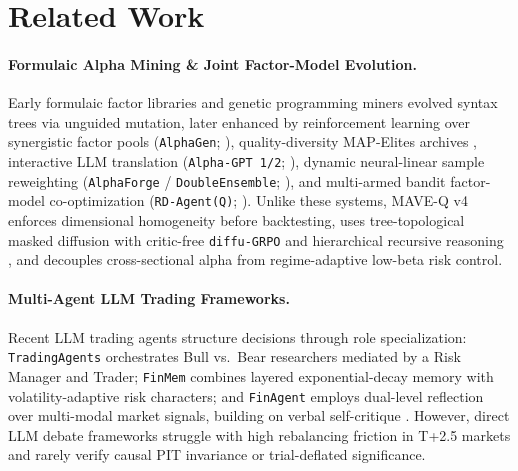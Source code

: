 \documentclass[11pt]{article}
\begin{document}
\section{Related Work}
\label{sec:related}
\paragraph{Formulaic Alpha Mining \& Joint Factor-Model Evolution.}
Early formulaic factor libraries \citep{kakushadze2016alpha101} and genetic programming miners \citep{zhang2020autoalpha} evolved syntax trees via unguided mutation, later enhanced by reinforcement learning over synergistic factor pools (\texttt{AlphaGen}; \citealt{yu2023alphagen}), quality-diversity MAP-Elites archives \citep{mouret2015mapelites}, interactive LLM translation (\texttt{Alpha-GPT 1/2}; \citealt{wang2023alphagpt,yuan2024alphagpt2}), dynamic neural-linear sample reweighting (\texttt{AlphaForge} / \texttt{DoubleEnsemble}; \citealt{shi2025alphaforge,zhang2020doubleensemble}), and multi-armed bandit factor-model co-optimization (\texttt{RD-Agent(Q)}; \citealt{li2025rdagentq}). Unlike these systems, MAVE-Q v4 enforces dimensional homogeneity before backtesting, uses tree-topological masked diffusion \citep{sahoo2024mdlm,peebles2023dit} with critic-free \texttt{diffu-GRPO} \citep{shao2024grpo,zhao2025d1} and hierarchical recursive reasoning \citep{wang2025hrm,jolicoeur2025trm}, and decouples cross-sectional alpha from regime-adaptive low-beta risk control.

\paragraph{Multi-Agent LLM Trading Frameworks.}
Recent LLM trading agents structure decisions through role specialization: \texttt{TradingAgents} \citep{xiao2024tradingagents} orchestrates Bull vs.\ Bear researchers mediated by a Risk Manager and Trader; \texttt{FinMem} \citep{yu2024finmem} combines layered exponential-decay memory with volatility-adaptive risk characters; and \texttt{FinAgent} \citep{zhang2024finagent} employs dual-level reflection over multi-modal market signals, building on verbal self-critique \citep{shinn2023reflexion,madaan2023selfrefine,wang2023voyager}. However, direct LLM debate frameworks struggle with high rebalancing friction in T+2.5 markets and rarely verify causal PIT invariance or trial-deflated significance.
\end{document}
